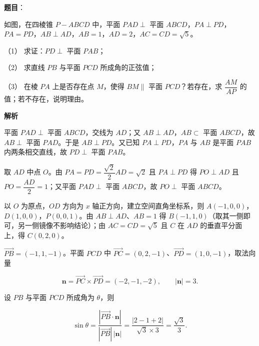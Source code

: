 \begin{answer}

\textbf{题目}：

如图，在四棱锥 \(P-ABCD\) 中，平面 \(PAD\perp\) 平面 \(ABCD\)，\(PA\perp PD\)，\(PA=PD\)，\(AB\perp AD\)，\(AB=1\)，\(AD=2\)，\(AC=CD=\sqrt{5}\)。
\nopagebreak[4]
\begin{center}\end{center}
\nopagebreak[4]
（1） 求证：\(PD\perp\) 平面 \(PAB\)；

（2） 求直线 \(PB\) 与平面 \(PCD\) 所成角的正弦值；

（3） 在棱 \(PA\) 上是否存在点 \(M\)，使得 \(BM\parallel\) 平面 \(PCD\)？若存在，求 \(\dfrac{AM}{AP}\) 的值；若不存在，说明理由。

\textbf{解析}


平面 \(PAD\perp\) 平面 \(ABCD\)，交线为 \(AD\)；又 \(AB\perp AD\)，\(AB\subset\) 平面 \(ABCD\)，故 \(AB\perp\) 平面 \(PAD\)。于是 \(AB\perp PD\)。又已知 \(PA\perp PD\)，\(PA\) 与 \(AB\) 是平面 \(PAB\) 内两条相交直线，故 \(PD\perp\) 平面 \(PAB\)。


取 \(AD\) 中点 \(O\)。由 \(PA=PD=\dfrac{\sqrt2}{2}AD=\sqrt2\) 且 \(PA\perp PD\) 得 \(PO\perp AD\) 且 \(PO=\dfrac{AD}{2}=1\)；又平面 \(PAD\perp\) 平面 \(ABCD\)，故 \(PO\perp\) 平面 \(ABCD\)。

以 \(O\) 为原点，\(OD\) 方向为 \(x\) 轴正方向，建立空间直角坐标系，则 \(A(-1,0,0)\)，\(D(1,0,0)\)，\(P(0,0,1)\)。由 \(AB\perp AD\)、\(AB=1\) 得 \(B(-1,1,0)\)（取其一侧即可，另一侧镜像不影响结论）；由 \(AC=CD=\sqrt5\) 且 \(C\) 在 \(AD\) 的垂直平分面上，得 \(C(0,2,0)\)。

\(\overrightarrow{PB}=(-1,1,-1)\)。平面 \(PCD\) 中 \(\overrightarrow{PC}=(0,2,-1)\)、\(\overrightarrow{PD}=(1,0,-1)\)，取法向量

\nopagebreak[4]
\[
\boldsymbol n=\overrightarrow{PC}\times\overrightarrow{PD}=(-2,-1,-2),\qquad|\boldsymbol n|=3 .
\]

设 \(PB\) 与平面 \(PCD\) 所成角为 \(\theta\)，则

\nopagebreak[4]
\[
\sin\theta=\frac{|\overrightarrow{PB}\cdot\boldsymbol n|}{|\overrightarrow{PB}|\,|\boldsymbol n|}
=\frac{|2-1+2|}{\sqrt3\times3}=\frac{\sqrt3}{3}.
\]



\end{answer}
